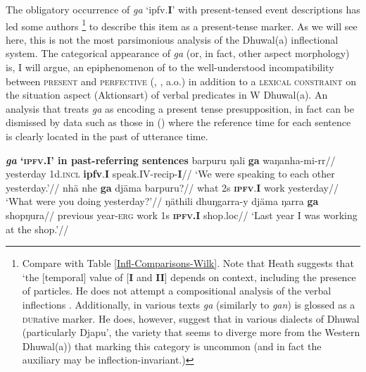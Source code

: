 \documentclass[11pt,dvipsnames]{report}
\begin{document}
The obligatory occurrence of \textit{ga} `\gls{ipfv}.\textbf{I}' with present-tensed event descriptions has led some authors \citep[e.g.][46]{Heath1980}\footnote{Compare with Table \ref{Infl-Comparisons-Wilk}. Note that Heath suggests that `the [temporal] value of [\textbf{I} and \textbf{II}] depends on context, including the presence of particles. He does not attempt a compositional analysis of the verbal inflections \citeyearpar[38,46]{Heath1980}. Additionally, in various texts \textit{ga} (similarly to \textit{gan}) is glossed as a \textsc{dur}ative marker. He does, however, suggest that in various dialects of Dhuwal (particularly Djapu', the variety that seems to diverge more from the Western Dhuwal(a)) that marking this category is uncommon (and in fact the auxiliary may be inflection-invariant.)} to describe this item as a present-tense marker. As we will see here, this is not the most parsimonious analysis of the Dhuwal(a) inflectional system. The categorical appearance of \textit{ga} (or, in fact, other aspect morphology) is, I will argue, an epiphenomenon of to the well-understood incompatibility between \textsc{present} and \textsc{perfective} (\citealp[66\textit{ff}]{Comrie1976}, \citealp[110]{Smith1997}, \citealp{Malchukov2009} a.o.) in addition to a \textsc{lexical constraint} on the situation aspect (Aktionsart) of verbal predicates in W Dhuwal(a). An analysis that treats \textit{ga} as encoding a present tense presupposition, in fact can be dismissed by data such as those in (\nextx) where the reference time for each sentence is clearly located in the past of utterance time.

\pex \textbf{\textit{ga} `\textsc{ipfv.I}' in past-referring sentences}
\a\begingl\gla barpuru ŋali \textbf{ga} waŋanha-mi-rr//
\glb yesterday 1d.\textsc{incl} \textbf{\gls{ipfv}}.\textbf{I} speak.IV-\gls{recip}-\textbf{I}//
\glft`We were speaking to each other yesterday.'\trailingcitation{[AW~20190426]}//\endgl
\a\begingl\gla nhä nhe \textbf{ga} djäma barpuru?//
\glb what 2s \textsc{\textbf{ipfv}}.\textbf{I} work yesterday//
\glft`What were you doing yesterday?'\trailingcitation{[DhG 20190413]}//\endgl
\a\begingl\gla ŋäthili dhuŋgarra-y djäma ŋarra \textbf{ga} shopŋura//
\glb previous year-\textsc{erg} work 1s \textsc{\textbf{ipfv.I}} shop.\gls{loc}//
\glft`Last year I was working at the shop.'\trailingcitation{[BM~20190416]}//\endgl
\xe
\end{document}
